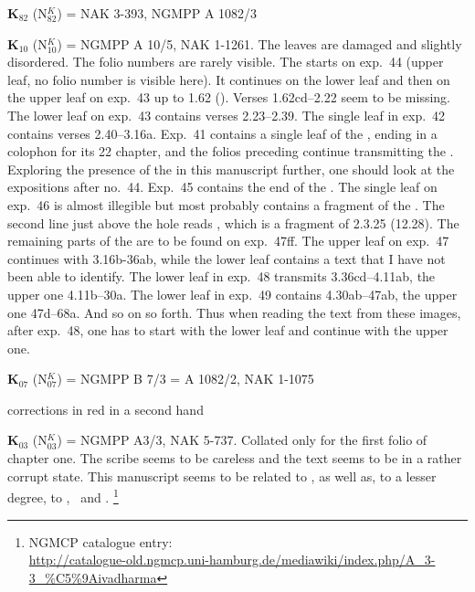 \documentclass[11pt]{book} %
\begin{document}
{%
{\large \textbf{K$_{\scriptscriptstyle 82}$}
(N$^{\scriptscriptstyle K}_{\scriptscriptstyle 82}$) =
NAK 3-393, NGMPP A 1082/3
\bigskip


{\large \textbf{K$_{\scriptscriptstyle 10}$}
(N$^{\scriptscriptstyle K}_{\scriptscriptstyle 10}$) =
NGMPP A 10/5, NAK 1-1261. 
The leaves are damaged and slightly disordered. The folio numbers are rarely visible.
The  starts on exp.\ 44 (upper leaf, no folio number is visible here).
It continues on the lower leaf and then on the upper leaf on exp.\ 43
up to 1.62 (). 
Verses 1.62cd--2.22 seem to be missing.
The lower leaf on exp.\ 43 contains verses 2.23--2.39.
The single leaf in exp.\ 42 contains verses 2.40--3.16a.
Exp.\ 41 contains a single leaf of the ,
ending in a colophon for its 22 chapter, 
and the folios preceding continue transmitting the .
Exploring the presence of the  in 
this manuscript further, one should look at the expositions after no.\ 44.
Exp.\ 45 contains the end of the .
The single leaf on exp.\ 46 is almost illegible but most probably contains
a fragment of the . The second line just above the hole
reads ,
which is a fragment of  2.3.25 (12.28).
The remaining parts of the  are to be found 
on exp.\ 47ff. The upper leaf on exp.\ 47 continues with  3.16b-36ab,
while the lower leaf contains a text that I have not been able to identify.
The lower leaf in exp.\ 48 transmits 3.36cd--4.11ab, the upper one 4.11b--30a.
The lower leaf in exp.\ 49 contains 4.30ab--47ab, the upper one 47d--68a. And so on so forth.
Thus when reading the text from these images, after exp.\ 48, 
one has to start with the lower leaf and continue with the upper one. 

\bigskip



{\large \textbf{K$_{\scriptscriptstyle 07}$}
(N$^{\scriptscriptstyle K}_{\scriptscriptstyle 07}$) =
NGMPP B 7/3 = A 1082/2, NAK 1-1075

corrections in red in a second hand

{\large \textbf{K$_{\scriptscriptstyle 03}$}
(N$^{\scriptscriptstyle K}_{\scriptscriptstyle 03}$) =
NGMPP A3/3, NAK  5-737. Collated only for the first folio of 
chapter one. The scribe seems to be careless and 
the text seems to be in a rather corrupt state. This manuscript
seems to be related to \msCc, as well as, to a lesser degree,
to \msNa, \msNb\ and
\hbox{\msNc.}%
\footnote{NGMCP catalogue entry: \\
\url{http://catalogue-old.ngmcp.uni-hamburg.de/mediawiki/index.php/A\_3-3\_\%C5\%9Aivadharma}}


}}}}}
\end{document}
